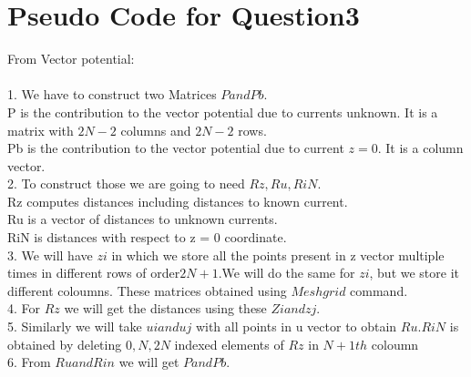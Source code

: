 \documentclass[11pt, a4paper]{article}
\begin{document}
\section{Pseudo Code for Question3}
From Vector potential:\\
\\
1. We have to construct two Matrices $P and Pb$.\\
 P is the contribution to the vector potential due to currents unknown. It is a matrix with $2N−2$ columns and
$2N−2$ rows.\\
 Pb is the contribution to the vector potential due to current $z=0$. It is a column vector.\\
2. To construct those we are going to need $Rz, Ru, RiN$.\\
Rz computes distances including distances to known current.\\
 Ru is a vector of distances to unknown currents.\\
 RiN is distances with respect to z = 0 coordinate.\\
3. We will have $zi$ in which we store all the points present in z vector multiple times in different rows of order$2N+1$.We will do the same for $zi$, but we store it different coloumns. These matrices obtained using $Meshgrid$ command.\\
4. For $Rz$ we will get the distances using these $Zi and zj$.\\
5. Similarly we will take $ui and uj$ with all points in u vector to obtain $Ru$.$RiN$ is obtained by deleting $0,N,2N$ indexed elements of $Rz$ in $N+1 th$ coloumn\\
6. From $Ru and Rin$ we will get $P and Pb$.
\end{document}
